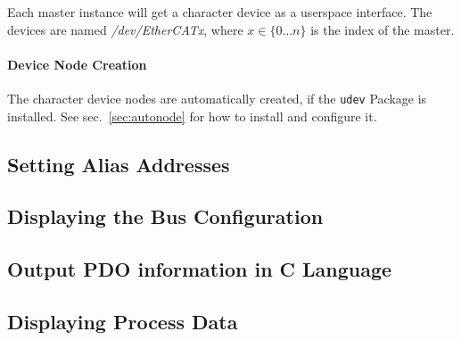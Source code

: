 \documentclass[a4paper,12pt,BCOR6mm,bibtotoc,idxtotoc]{scrbook}
\begin{document}
Each master instance will get a character device as a userspace interface.
The devices are named \textit{/dev/EtherCATx}, where $x \in \{0 \ldots n\}$ is
the index of the master.

\paragraph{Device Node Creation} The character device nodes are automatically
created, if the \lstinline+udev+ Package is installed. See
sec.~\ref{sec:autonode} for how to install and configure it.


\subsection{Setting Alias Addresses}
\label{sec:ethercat-alias}




\subsection{Displaying the Bus Configuration}
\label{sec:ethercat-config}




\subsection{Output PDO information in C Language}
\label{sec:ethercat-cstruct}




\subsection{Displaying Process Data}


\end{document}
